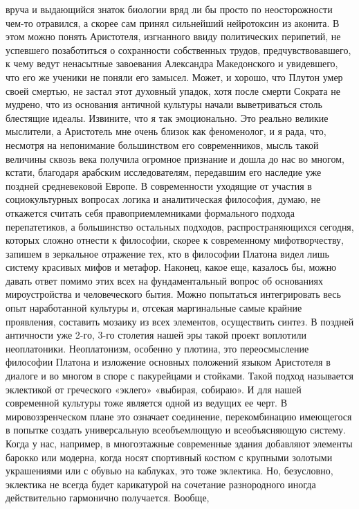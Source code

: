 вруча и выдающийся знаток биологии вряд ли бы просто по неосторожности чем-то
отравился, а скорее сам принял сильнейший нейротоксин из аконита. В этом можно
понять Аристотеля, изгнанного ввиду политических перипетий, не успевшего
позаботиться о сохранности собственных трудов, предчувствовавшего, к чему ведут
ненасытные завоевания Александра Македонского и увидевшего, что его же ученики
не поняли его замысел. Может, и хорошо, что Плутон умер своей смертью, не застал
этот духовный упадок, хотя после смерти Сократа не мудрено, что из основания
античной культуры начали выветриваться столь блестящие идеалы. Извините, что я
так эмоционально. Это реально великие мыслители, а Аристотель мне очень близок
как феноменолог, и я рада, что, несмотря на непонимание большинством его
современников, мысль такой величины сквозь века получила огромное признание и
дошла до нас во многом, кстати, благодаря арабским исследователям, передавшим
его наследие уже поздней средневековой Европе. В современности уходящие от
участия в социокультурных вопросах логика и аналитическая философия, думаю, не
откажется считать себя правоприемлемниками формального подхода перепатетиков, а
большинство остальных подходов, распространяющихся сегодня, которых сложно
отнести к философии, скорее к современному мифотворчеству, запишем в зеркальное
отражение тех, кто в философии Платона видел лишь систему красивых мифов и
метафор. Наконец, какое еще, казалось бы, можно давать ответ помимо этих всех на
фундаментальный вопрос об основаниях мироустройства и человеческого бытия. Можно
попытаться интегрировать весь опыт наработанной культуры и, отсекая маргинальные
самые крайние проявления, составить мозаику из всех элементов, осуществить
синтез. В поздней античности уже 2-го, 3-го столетия нашей эры такой проект
воплотили неоплатоники. Неоплатонизм, особенно у плотина, это переосмысление
философии Платона и изложение основных положений языком Аристотеля в диалоге и
во многом в споре с пакурейцами и стойками. Такой подход называется эклектикой
от греческого «эклего» «выбирая, собираю». И для нашей современной культуры тоже
является одной из ведущих ее черт. В мировоззренческом плане это означает
соединение, перекомбинацию имеющегося в попытке создать универсальную
всеобъемлющую и всеобъясняющую систему. Когда у нас, например, в многоэтажные
современные здания добавляют элементы барокко или модерна, когда носят
спортивный костюм с крупными золотыми украшениями или с обувью на каблуках, это
тоже эклектика. Но, безусловно, эклектика не всегда будет карикатурой на
сочетание разнородного иногда действительно гармонично получается. Вообще,
